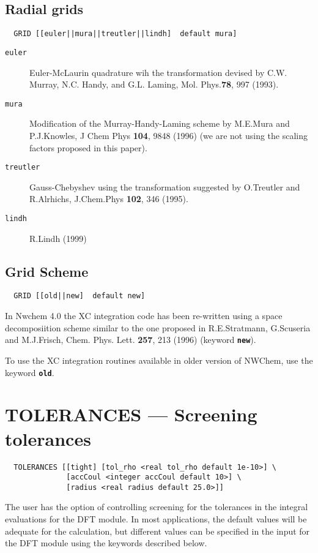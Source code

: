 \subsection{Radial grids}

\begin{verbatim}
  GRID [[euler||mura||treutler||lindh]  default mura]
\end{verbatim}

\begin{description}
\item[\tt euler] Euler-McLaurin quadrature wih the transformation
  devised by
C.W. Murray, N.C. Handy, and G.L. Laming,
Mol. Phys.{\bf 78}, 997 (1993).
 \\
\item[\tt mura] Modification of the Murray-Handy-Laming scheme by 
M.E.Mura and P.J.Knowles, J Chem Phys {\bf 104}, 9848
(1996) (we are not using the scaling factors proposed
in this paper).\\
\item[\tt treutler] Gauss-Chebyshev using the transformation suggested
  by O.Treutler and R.Alrhichs, J.Chem.Phys {\bf 102}, 346 (1995).\\
\item[\tt lindh] R.Lindh (1999)
\end{description}

\subsection{Grid Scheme}

\begin{verbatim}
  GRID [[old||new]  default new]
\end{verbatim}

In Nwchem 4.0 the XC integration code has been re-written using a
space decomposiition scheme similar to the one proposed in R.E.Stratmann, G.Scuseria and  M.J.Frisch,
Chem. Phys. Lett. {\bf 257}, 213 (1996) (keyword
{\bf \tt new}). 

To use the XC integration routines available in
older version of NWChem, use the keyword {\bf \tt old}.


\section{TOLERANCES --- Screening tolerances}

\begin{verbatim}
  TOLERANCES [[tight] [tol_rho <real tol_rho default 1e-10>] \
              [accCoul <integer accCoul default 10>] \
              [radius <real radius default 25.0>]]
\end{verbatim}
%
%
The user has the option of controlling screening for the tolerances in
the integral evaluations for the DFT module.  In most applications,
the default values will be adequate for the calculation, but different
values can be specified in the input for the DFT module using the
keywords described below.

